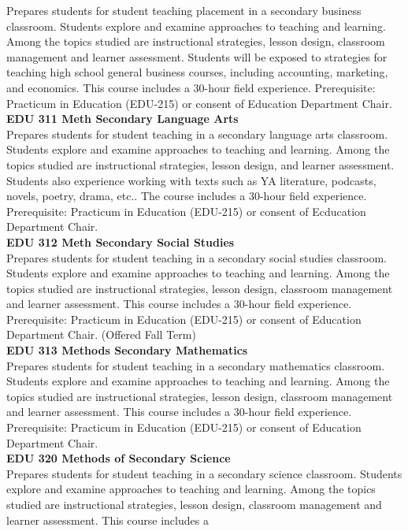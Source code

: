 \documentclass[
  letterpaper,
]{scrbook}
\begin{document}
Prepares students for student teaching placement in a secondary business
classroom. Students explore and examine approaches to teaching and
learning. Among the topics studied are instructional strategies, lesson
design, classroom management and learner assessment. Students will be
exposed to strategies for teaching high school general business courses,
including accounting, marketing, and economics. This course includes a
30-hour field experience. Prerequisite: Practicum in Education (EDU-215)
or consent of Education Department Chair.\\
\textbf{EDU 311 Meth Secondary Language Arts}\\
Prepares students for student teaching in a secondary language arts
classroom. Students explore and examine approaches to teaching and
learning. Among the topics studied are instructional strategies, lesson
design, and learner assessment. Students also experience working with
texts such as YA literature, podcasts, novels, poetry, drama, etc.. The
course includes a 30-hour field experience. Prerequisite: Practicum in
Education (EDU-215) or consent of Ecducation Department Chair.\\
\textbf{EDU 312 Meth Secondary Social Studies}\\
Prepares students for student teaching in a secondary social studies
classroom. Students explore and examine approaches to teaching and
learning. Among the topics studied are instructional strategies, lesson
design, classroom management and learner assessment. This course
includes a 30-hour field experience. Prerequisite: Practicum in
Education (EDU-215) or consent of Education Department Chair. (Offered
Fall Term)\\
\textbf{EDU 313 Methods Secondary Mathematics}\\
Prepares students for student teaching in a secondary mathematics
classroom. Students explore and examine approaches to teaching and
learning. Among the topics studied are instructional strategies, lesson
design, classroom management and learner assessment. This course
includes a 30-hour field experience. Prerequisite: Practicum in
Education (EDU-215) or consent of Education Department Chair.\\
\textbf{EDU 320 Methods of Secondary Science}\\
Prepares students for student teaching in a secondary science classroom.
Students explore and examine approaches to teaching and learning. Among
the topics studied are instructional strategies, lesson design,
classroom management and learner assessment. This course includes a
\end{document}
